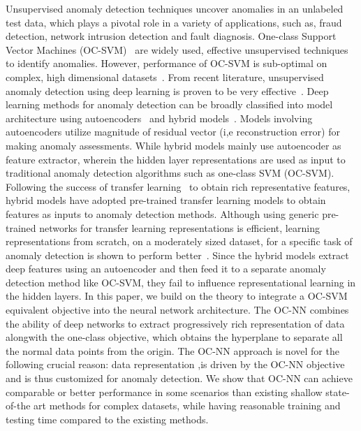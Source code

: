 Unsupervised anomaly detection techniques uncover anomalies in an unlabeled test data, which plays a pivotal role in a variety of applications, such as, fraud detection, network intrusion detection and fault diagnosis. One-class Support Vector Machines (OC-SVM)~\cite{scholkopf2002support,tax2004support} are widely used, effective unsupervised techniques to identify anomalies. However, performance of OC-SVM is sub-optimal on complex, high dimensional datasets~\cite{vapnik1998statistical,vishwanathan2003simplesvm,bengio2007scaling}.
From recent literature, unsupervised anomaly detection using deep learning is proven to be very effective~\cite{zhou2017anomaly,chalapathy2017robust}. Deep learning methods for anomaly detection can be broadly classified into model architecture using autoencoders~\cite{andrews2016detecting} and hybrid models~\cite{erfani2016high}. Models involving autoencoders utilize magnitude of residual vector (i,e reconstruction error) for making anomaly assessments. While hybrid models mainly use autoencoder as feature extractor, wherein the hidden layer representations are used as input to traditional anomaly detection algorithms such as one-class SVM (OC-SVM). Following the success of transfer learning~\cite{pan2010survey} to obtain rich representative features, hybrid models have adopted pre-trained transfer learning models to obtain features as inputs to anomaly detection methods. Although using generic pre-trained networks for transfer learning representations is efficient, learning representations from scratch, on a moderately sized dataset, for a specific task of anomaly detection is shown to perform better~\cite{andrews2016transfer}. Since the hybrid models extract deep features using an autoencoder and then feed it to a separate anomaly detection method like OC-SVM, they fail to influence representational learning in the hidden layers. In this paper, we build on the theory to integrate a OC-SVM equivalent objective into the neural network architecture. The OC-NN combines the ability of deep networks to extract progressively rich representation of data alongwith the one-class objective, which obtains the hyperplane to separate all the normal data points from the origin. The OC-NN approach is novel for the following crucial reason:  data representation ,is driven by the OC-NN objective and is thus customized for anomaly detection. We show that OC-NN can achieve comparable or better performance in some scenarios than existing shallow state-of-the art methods for complex datasets, while having reasonable training and testing time compared to the existing methods.

